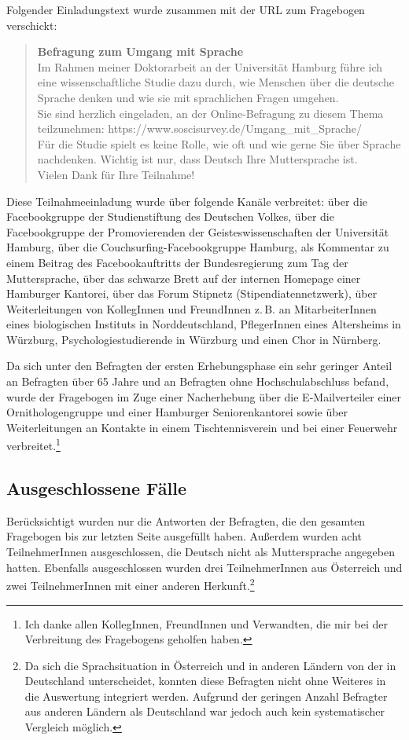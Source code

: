Folgender Einladungstext wurde zusammen mit der URL zum Fragebogen verschickt: 
\begin{quote}
\glqq \textbf{Befragung zum Umgang mit Sprache}\\
Im Rahmen meiner Doktorarbeit an der Universität Hamburg führe ich eine wissenschaftliche Studie dazu durch, wie Menschen über die deutsche Sprache denken und wie sie mit sprachlichen Fragen umgehen.\\
Sie sind herzlich eingeladen, an der Online-Befragung zu diesem Thema teilzunehmen: https://www.soscisurvey.de/Umgang\_mit\_Sprache/ \\
Für die Studie spielt es keine Rolle, wie oft und wie gerne Sie über Sprache nachdenken. Wichtig ist nur, dass Deutsch Ihre Muttersprache ist. \\
Vielen Dank für Ihre Teilnahme!\grqq{}
\end{quote}
Diese Teilnahmeeinladung wurde über folgende Kanäle verbreitet: über die Facebookgruppe der Studienstiftung des Deutschen Volkes, über die Facebookgruppe der Promovierenden der Geisteswissenschaften der Universität Hamburg, über die Couchsurfing-Facebookgruppe Hamburg, als Kommentar zu einem Beitrag des Facebookauftritts der Bundesregierung zum Tag der Muttersprache, über das schwarze Brett auf der internen Homepage einer Hamburger Kantorei, über das Forum Stipnetz (Stipendiatennetzwerk), über Weiterleitungen von KollegInnen und FreundInnen z.\,B. an MitarbeiterInnen eines biologischen Instituts in Norddeutschland, PflegerInnen eines Altersheims in Würzburg, Psychologiestudierende in Würzburg und einen Chor in Nürnberg. 

Da sich unter den Befragten der ersten Erhebungsphase ein sehr geringer Anteil an Befragten über 65 Jahre und an Befragten ohne Hochschulabschluss befand, wurde der Fragebogen im Zuge einer Nacherhebung über die E\hyp Mailverteiler einer Ornithologengruppe und einer Hamburger Seniorenkantorei sowie über Weiterleitungen an Kontakte in einem Tischtennisverein und bei einer Feuerwehr verbreitet.\footnote{Ich danke allen KollegInnen, FreundInnen und Verwandten, die mir bei der Verbreitung des Fragebogens geholfen haben.}

\subsection{Ausgeschlossene Fälle}
\label{sec:Ausschluss}
Berücksichtigt wurden nur die Antworten der Befragten, die den gesamten Fragebogen bis zur letzten Seite ausgefüllt haben. 
Außerdem wurden acht TeilnehmerInnen ausgeschlossen, die Deutsch nicht als Muttersprache angegeben hatten.
Ebenfalls ausgeschlossen wurden drei TeilnehmerInnen aus Österreich und zwei TeilnehmerInnen mit einer anderen Herkunft.\footnote{Da sich die Sprachsituation in Österreich und in anderen Ländern von der in Deutschland unterscheidet, konnten diese Befragten nicht ohne Weiteres in die Auswertung integriert werden. Aufgrund der geringen Anzahl Befragter aus anderen Ländern als Deutschland war jedoch auch kein systematischer Vergleich möglich.} 

